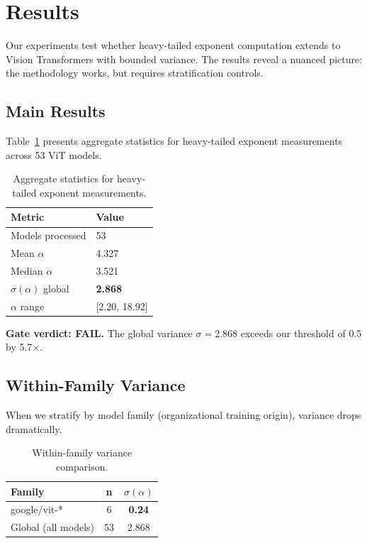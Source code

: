 \section{Results}
\label{sec:results}

Our experiments test whether heavy-tailed exponent computation extends to Vision Transformers with bounded variance. The results reveal a nuanced picture: the methodology works, but requires stratification controls.

\subsection{Main Results}

Table~\ref{tab:main} presents aggregate statistics for heavy-tailed exponent measurements across 53 ViT models.

\begin{table}[h]
\centering
\begin{tabular}{@{}ll@{}}
\toprule
Metric & Value \\
\midrule
Models processed & 53 \\
Mean $\alpha$ & 4.327 \\
Median $\alpha$ & 3.521 \\
$\sigma(\alpha)$ global & \textbf{2.868} \\
$\alpha$ range & [2.20, 18.92] \\
\bottomrule
\end{tabular}
\caption{Aggregate statistics for heavy-tailed exponent measurements.}
\label{tab:main}
\end{table}

\textbf{Gate verdict: FAIL.} The global variance $\sigma = 2.868$ exceeds our threshold of 0.5 by 5.7$\times$.

\subsection{Within-Family Variance}

When we stratify by model family (organizational training origin), variance drops dramatically.

\begin{table}[h]
\centering
\begin{tabular}{@{}lcc@{}}
\toprule
Family & n & $\sigma(\alpha)$ \\
\midrule
google/vit-* & 6 & \textbf{0.24} \\
Global (all models) & 53 & 2.868 \\
\bottomrule
\end{tabular}
\caption{Within-family variance comparison.}
\label{tab:family}
\end{table}

